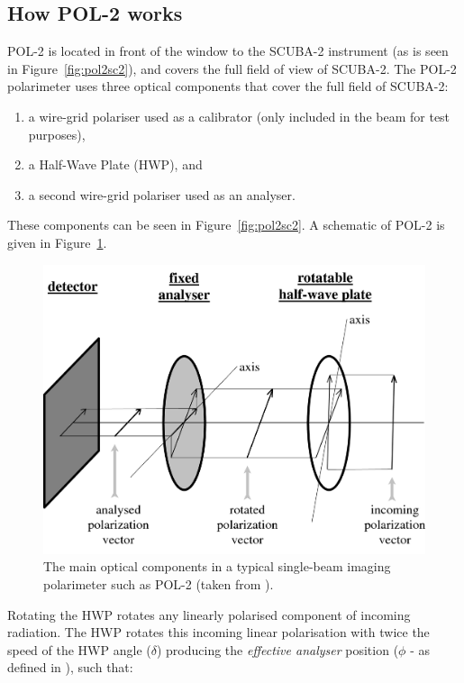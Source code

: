 \subsection*{How POL-2 works}

POL-2 is located in front of the window to the SCUBA-2 instrument (as
is seen in Figure~\ref{fig:pol2sc2}), and covers the full field of
view of SCUBA-2. The POL-2 polarimeter uses three optical components
that cover the full field of SCUBA-2:

\begin{enumerate}
\item a wire-grid polariser used as a calibrator (only included in the
  beam for test purposes),
\item a Half-Wave Plate (HWP), and
\item a second wire-grid polariser used as an analyser.
\end{enumerate}

These components can be seen in Figure~\ref{fig:pol2sc2}.  A schematic
of POL-2 is given in Figure~\ref{fig:pol2sc2diagram}.

\begin{figure}[t!]
\begin{center}
\includegraphics[width=0.8\linewidth]{singopt.png}
\caption [POL-2 optical components]{ The main optical components in a
  typical single-beam imaging polarimeter such as POL-2 (taken from
  ).}
\label{fig:pol2sc2diagram}
\end{center}
\end{figure}

Rotating the HWP rotates any linearly polarised component of incoming
radiation. The HWP rotates this incoming linear polarisation with
twice the speed of the HWP angle ($\delta$) producing the
\emph{effective analyser} position ($\phi$ - as defined in
), such that:


